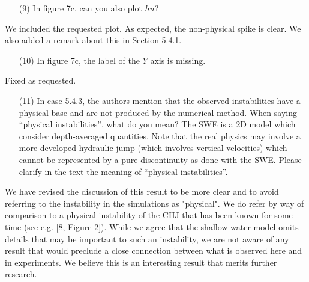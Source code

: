 \documentclass[english,11pt]{article}
\begin{document}
\bigskip
{\color{OliveGreen}
  \begin{itemize}
  \item[(9)]
    In figure 7c, can you also plot $hu$?
  \end{itemize}
}
\noindent
We included the requested plot. As expected, the non-physical spike is clear.
We also added a remark about this in Section 5.4.1.

\bigskip
{\color{OliveGreen}
  \begin{itemize}
  \item[(10)]
    In figure 7c, the label of the $Y$ axis is missing.
  \end{itemize}
}
\noindent
Fixed as requested.

\bigskip
{\color{OliveGreen}
  \begin{itemize}
  \item[(11)]
    In case 5.4.3, the authors mention that the observed instabilities have a physical base and are not 
    produced by the numerical method. When saying ``physical instabilities'', what do you mean? 
    The SWE is a 2D model which consider depth-averaged quantities. Note that the real physics may involve 
    a more developed hydraulic jump (which involves vertical velocities) which cannot be represented by a 
    pure discontinuity as done with the SWE. Please clarify in the text the meaning of ``physical instabilities''.
  \end{itemize}
}
\noindent
We have revised the discussion of this result to be more clear and to avoid
referring to the instability in the simulations as "physical".  We do refer by
way of comparison to a physical instability of the CHJ that has been known for
some time
(see e.g. [8, Figure 2]).  While we agree that the shallow water model omits
details that may be important to such an instability, we are not aware of any result that
would preclude a close connection between what is observed here and in experiments.
We believe this is an interesting result that merits further research.



\end{document}
